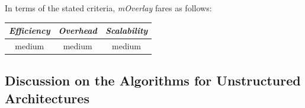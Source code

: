 %
In terms of the stated criteria, \emph{mOverlay} fares as follows:
\begin{center}
{\footnotesize
\begin{tabular}{ccc}
\emph{Efficiency} & \emph{Overhead} & \emph{Scalability} \\
\hline
medium &
medium &
medium
\end{tabular}
}
\end{center}

\subsection{Discussion on the Algorithms for Unstructured Architectures}




